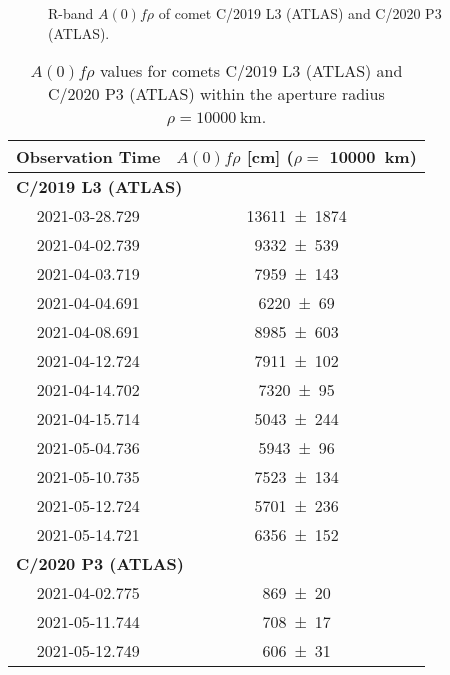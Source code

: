\begin{figure}
    \centering

    \caption{R-band $A(0)f\rho$ of comet C/2019 L3 (ATLAS) and C/2020 P3 (ATLAS). }
    \label{fig:Afrho}
\end{figure}

\begin{table}
    \centering
    \caption{$A(0)f\rho$ values for comets C/2019 L3 (ATLAS) and C/2020 P3 (ATLAS) within the aperture radius $\rho = \qty{10000}{\km}$. }\label{tab:afrho}
    \begin{threeparttable}
        \begin{tabular}{cc}
            \toprule
            Observation Time & $A(0)f\rho$ [\unit{\cm}] ($\rho =$ \qty{10000}{\km}) \\
            \midrule
            \multicolumn{2}{l}{\textbf{C/2019 L3 (ATLAS)}} \\
            2021-03-28.729 & \num{13611 +- 1874} \\
            2021-04-02.739 & \num{9332 +- 539} \\
            2021-04-03.719 & \num{7959 +- 143} \\
            2021-04-04.691 & \num{6220 +- 69} \\
            2021-04-08.691 & \num{8985 +- 603} \\
            2021-04-12.724 & \num{7911 +- 102} \\
            2021-04-14.702 & \num{7320 +- 95} \\
            2021-04-15.714 & \num{5043 +- 244} \\
            2021-05-04.736 & \num{5943 +- 96} \\
            2021-05-10.735 & \num{7523 +- 134} \\
            2021-05-12.724 & \num{5701 +- 236} \\
            2021-05-14.721 & \num{6356 +- 152} \\
            \multicolumn{2}{l}{\textbf{C/2020 P3 (ATLAS)}} \\
            2021-04-02.775 & \num{869 +- 20} \\
            2021-05-11.744 & \num{708 +- 17} \\
            2021-05-12.749 & \num{606 +- 31} \\
            \bottomrule
        \end{tabular}
    \end{threeparttable}
\end{table}
